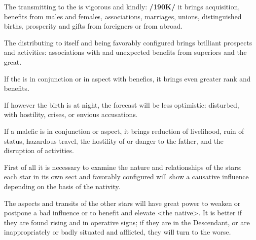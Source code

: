The \Sun\xspace transmitting to the \Moon\xspace is vigorous and kindly: \textbf{/190K/} it brings acquisition, benefits from males and females, associations, marriages, unions, distinguished births, prosperity and gifts from foreigners or from abroad.

The \Sun\xspace distributing to itself and being favorably configured brings brilliant prospects and activities:
associations with and unexpected benefits from superiors and the great. 

If the \Sun\xspace is in conjunction or in aspect with benefics, it brings even greater rank and benefits. 

If however the birth is at night, the forecast will be less optimistic: disturbed, with hostility, crises, or envious accusations. 

If a malefic is in conjunction or aspect, it brings reduction of livelihood, ruin of status, hazardous travel, the hostility of or danger to the father, and the disruption of activities.

First of all it is necessary to examine the nature and relationships of the stars: each star in its own sect and favorably configured will show a causative influence depending on the basis of the nativity. 

The aspects and transits of the other stars will have great power to weaken or postpone a bad influence or to benefit and elevate <the native>. It is better if they are found rising and in operative signs; if they are in the Descendant, or are inappropriately or badly situated and afflicted, they will turn to the worse.

\newpage